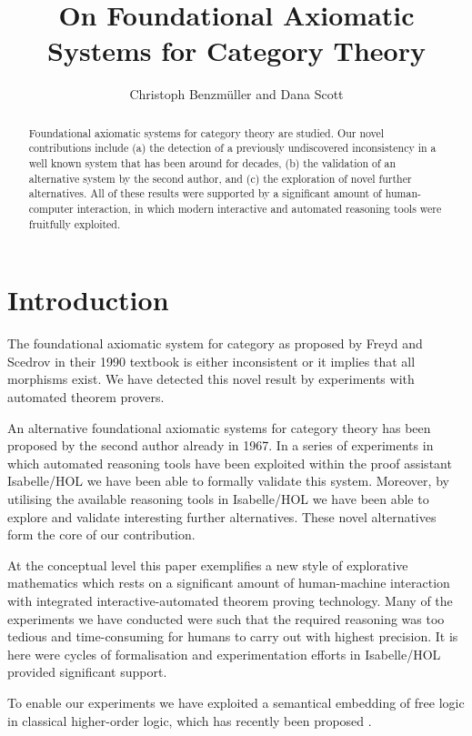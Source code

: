 \documentclass{article}
\title{On Foundational Axiomatic Systems for Category Theory}
\author{Christoph Benzm\"uller and Dana Scott}
\begin{document}
\maketitle

\begin{abstract}
Foundational axiomatic systems for category theory are studied. Our novel contributions include
(a) the detection of a previously undiscovered inconsistency in a well known system that has been around for decades, (b) the validation of an alternative system by the second author, and (c) the exploration of novel further alternatives. All of these results were supported by a significant amount of human-computer interaction, in which modern interactive and automated reasoning tools were fruitfully exploited.  
\end{abstract}


\section{Introduction}
The foundational  axiomatic system for category as proposed by Freyd and Scedrov in their 1990 textbook \cite{FreydScedrov90} is either inconsistent or it implies that all morphisms exist. We have detected this novel result by experiments with automated theorem provers. 

An alternative foundational axiomatic systems for category theory has been proposed by the second author already in 1967. In a series of experiments in which automated reasoning tools have been exploited within the proof assistant Isabelle/HOL we have been able to formally validate this system. Moreover, by utilising the available reasoning tools in Isabelle/HOL we have been able to explore and validate interesting further alternatives. These novel alternatives form the core of our contribution.

At the conceptual level this paper exemplifies a new style of explorative mathematics which rests on a significant amount of human-machine interaction with integrated interactive-automated theorem proving technology. Many of the experiments we have conducted were such that the required reasoning was too tedious and time-consuming for humans to carry out with highest precision. It is here were cycles of formalisation and experimentation efforts in Isabelle/HOL provided significant support.

To enable our experiments we have exploited a semantical embedding of free logic in classical higher-order logic, which has recently been proposed \cite{ICMS16}. 
\end{document}
